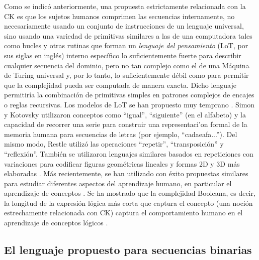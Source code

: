 Como se indicó anteriormente, una propuesta estrictamente relacionada con la CK es que los sujetos humanos comprimen las secuencias internamente, no necesariamente usando un conjunto de instrucciones de un lenguaje universal, sino usando una variedad de primitivas similares a las de una computadora tales como bucles y otras rutinas que forman un \textit{lenguaje del pensamiento} (LoT, por sus siglas en inglés) interno específico \cite{fodor1975language} lo suficientemente fuerte para describir cualquier secuencia del dominio, pero no tan complejo como el de una Máquina de Turing universal y, por lo tanto, lo suficientemente débil como para permitir que la complejidad pueda ser computada de manera exacta. Dicho lenguaje permitiría la combinación de primitivas simples en patrones complejos de encajes o reglas recursivas. Los modelos de LoT se han propuesto muy temprano \cite{f33}. Simon y Kotovsky \cite{f48} utilizaron conceptos como ``igual'', ``siguiente'' (en el alfabeto) y la capacidad de recorrer una serie para construir una representaci'on formal de la memoria humana para secuencias de letras (por ejemplo, ``cadaeafa...''). Del mismo modo, Restle \cite{f37} utilizó las operaciones ``repetir'', ``transposición'' y ``reflexión''. También se utilizaron lenguajes similares basados en repeticiones con variaciones para codificar figuras geométricas lineales y formas 2D y 3D más elaboradas \cite{f33,leeuwenberg1971perceptual}. Más recientemente, se han utilizado con éxito propuestas similares para estudiar diferentes aspectos del aprendizaje humano, en particular el aprendizaje de conceptos \cite{feldman2000minimization,f51, piantadosi2012bootstrapping,piantadosi2016four,f54}. Se ha mostrado que la complejidad Booleana, es decir, la longitud de la expresión lógica más corta que captura el concepto (una noción estrechamente relacionada con CK) captura el comportamiento humano en el aprendizaje de conceptos lógicos \cite{feldman2000minimization,feldman2003simplicity}.

\subsection{El lenguaje propuesto para secuencias binarias}


